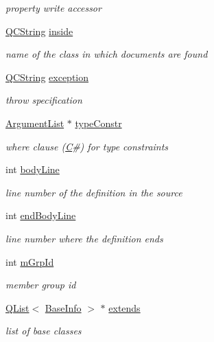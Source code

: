 \begin{DoxyCompactItemize}
\begin{DoxyCompactList}\small\item\em property write accessor \end{DoxyCompactList}\item 
\hyperlink{class_q_c_string}{Q\+C\+String} \hyperlink{class_entry_af88583a31bcd3cfc5aa52691f958833f}{inside}
\begin{DoxyCompactList}\small\item\em name of the class in which documents are found \end{DoxyCompactList}\item 
\hyperlink{class_q_c_string}{Q\+C\+String} \hyperlink{class_entry_a81b9c13cc15e3460c8d9fdcabeb9342d}{exception}
\begin{DoxyCompactList}\small\item\em throw specification \end{DoxyCompactList}\item 
\hyperlink{class_argument_list}{Argument\+List} $\ast$ \hyperlink{class_entry_a77d30ef01feb28bf83b77d4148968f84}{type\+Constr}
\begin{DoxyCompactList}\small\item\em where clause (\hyperlink{class_c}{C}\#) for type constraints \end{DoxyCompactList}\item 
int \hyperlink{class_entry_a9a2b1e3404f4723d8a6bef5966146ed0}{body\+Line}
\begin{DoxyCompactList}\small\item\em line number of the definition in the source \end{DoxyCompactList}\item 
int \hyperlink{class_entry_a2db88158279ecfe391ea775f63869fc1}{end\+Body\+Line}
\begin{DoxyCompactList}\small\item\em line number where the definition ends \end{DoxyCompactList}\item 
int \hyperlink{class_entry_a9f7167fc5b369f1fcd343946803efa0d}{m\+Grp\+Id}
\begin{DoxyCompactList}\small\item\em member group id \end{DoxyCompactList}\item 
\hyperlink{class_q_list}{Q\+List}$<$ \hyperlink{struct_base_info}{Base\+Info} $>$ $\ast$ \hyperlink{class_entry_a22b4c7b8255e183b68c49d5bd9f04017}{extends}
\begin{DoxyCompactList}\small\item\em list of base classes \end{DoxyCompactList}\item 

\end{DoxyCompactItemize}
